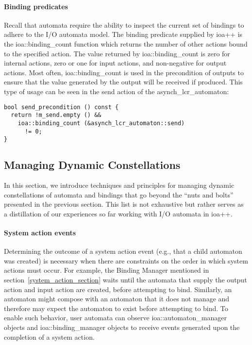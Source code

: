 \paragraph*{Binding predicates}
Recall that automata require the ability to inspect the current set of bindings to adhere to the I/O automata model.
The binding predicate supplied by ioa++ is the ioa::binding\_count function which returns the number of other actions bound to the specified action.
The value returned by ioa::binding\_count is zero for internal actions, zero or one for input actions, and non-negative for output actions.
Most often, ioa::binding\_count is used in the precondition of outputs to ensure that the value generated by the output will be received if produced.
\ifjournal
This type of usage can be seen in the send action of the asynch\_lcr\_automaton:
\begin{lstlisting}
bool send_precondition () const {
  return !m_send.empty () &&
    ioa::binding_count (&asynch_lcr_automaton::send)
      != 0;
}
\end{lstlisting}
\fi

\subsection{Managing Dynamic Constellations\label{constellations}}

In this section, we introduce techniques and principles for managing dynamic constellations of automata and bindings that go beyond the ``nuts and bolts'' presented in the previous section.
This list is not exhaustive but rather serves as a distillation of our experiences so far working with I/O automata in ioa++.

\paragraph*{System action events}
Determining the outcome of a system action event (e.g., that a child automaton was created) is necessary when there are constraints on the order in which system actions must occur.
For example, the Binding Manager mentioned in section~\ref{system_action_section} waits until the automata that supply the output action and input action are created, before attempting to bind.
Similarly, an automaton might compose with an automaton that it does not manage and therefore may expect the automaton to exist before attempting to bind.
To enable such behavior, user automata can observe ioa::automaton\_manager objects and ioa::binding\_manager objects to receive events generated upon the completion of a system action.

